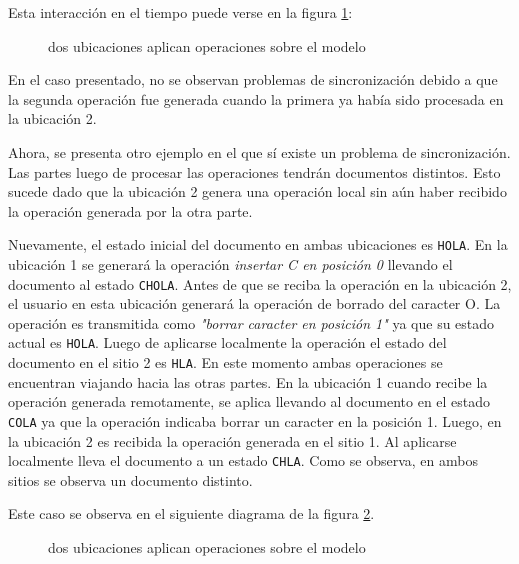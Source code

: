 \documentclass[12pt,a4paper]{article}
\begin{document}
	Esta interacción en el tiempo puede verse en la figura \ref{secuencia_ops_1}:

	\begin{figure}[!ht]
		\begin{center}
			\caption{\label{secuencia_ops_1} dos ubicaciones aplican operaciones sobre el modelo }
		\end{center}
	\end{figure}

	En el caso presentado, no se observan problemas de sincronización debido a que la segunda operación fue 
	generada cuando la primera ya había sido procesada en la ubicación 2.

	Ahora, se presenta otro ejemplo en el que sí existe un problema de sincronización. Las partes luego de procesar
	las operaciones tendrán documentos distintos. Esto sucede dado que la ubicación 2 genera una operación local 
	sin aún haber recibido la operación generada por la otra parte.
	
	Nuevamente, el estado inicial del documento en ambas ubicaciones es \texttt{HOLA}. En la ubicación 1
	se generará la operación \textit{insertar C en posición 0} llevando el documento al estado \texttt{CHOLA}.
	Antes de que se reciba la operación en la ubicación 2, el usuario en esta ubicación generará la operación
	de borrado del caracter O. La operación es transmitida como \textit{"borrar caracter en posición 1"} ya que
	su estado actual es \texttt{HOLA}. Luego de aplicarse localmente la operación el estado del documento en
	el sitio 2 es \texttt{HLA}.
	En este momento ambas operaciones se encuentran viajando hacia las otras partes. En la ubicación 1 cuando recibe
	la operación generada remotamente, se aplica llevando al documento en el estado \texttt{COLA} ya que la
	operación indicaba borrar un caracter en la posición 1. Luego, en la ubicación 2 es recibida la operación
	generada en el sitio 1. Al aplicarse localmente lleva el documento a un estado \texttt{CHLA}.
	Como se observa, en ambos sitios se observa un documento distinto.

	Este caso se observa en el siguiente diagrama de la figura \ref{secuencia_ops_2}.
	
	\begin{figure}[!ht]
		\begin{center}
			\caption{\label{secuencia_ops_2} dos ubicaciones aplican operaciones sobre el modelo }
		\end{center}
	\end{figure}
\end{document}
